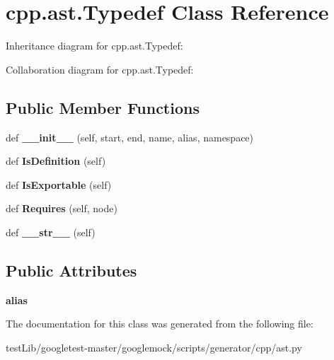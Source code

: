 \hypertarget{classcpp_1_1ast_1_1Typedef}{}\section{cpp.\+ast.\+Typedef Class Reference}
\label{classcpp_1_1ast_1_1Typedef}


Inheritance diagram for cpp.\+ast.\+Typedef\+:


Collaboration diagram for cpp.\+ast.\+Typedef\+:
\subsection*{Public Member Functions}
\begin{DoxyCompactItemize}
\item 
\mbox{\label{classcpp_1_1ast_1_1Typedef_af3275d2390190a074de470c1424e05e0}} 
def {\bfseries \+\_\+\+\_\+init\+\_\+\+\_\+} (self, start, end, name, alias, namespace)
\item 
\mbox{\label{classcpp_1_1ast_1_1Typedef_a103bf391e665884bfbfd20fc5e6d1a19}} 
def {\bfseries Is\+Definition} (self)
\item 
\mbox{\label{classcpp_1_1ast_1_1Typedef_adee58e4674b049d8e4435b5b6ad8e1d4}} 
def {\bfseries Is\+Exportable} (self)
\item 
\mbox{\label{classcpp_1_1ast_1_1Typedef_aa9f65f4a97ba340f2c9ebc5e7ce27e8c}} 
def {\bfseries Requires} (self, node)
\item 
\mbox{\label{classcpp_1_1ast_1_1Typedef_a451920900affc5f12e38ab8fbf5e3dea}} 
def {\bfseries \+\_\+\+\_\+str\+\_\+\+\_\+} (self)
\end{DoxyCompactItemize}
\subsection*{Public Attributes}
\begin{DoxyCompactItemize}
\item 
\mbox{\label{classcpp_1_1ast_1_1Typedef_a3187a504dfbefe50b866b44902823c30}} 
{\bfseries alias}
\end{DoxyCompactItemize}


The documentation for this class was generated from the following file\+:\begin{DoxyCompactItemize}
\item 
test\+Lib/googletest-\/master/googlemock/scripts/generator/cpp/ast.\+py\end{DoxyCompactItemize}
